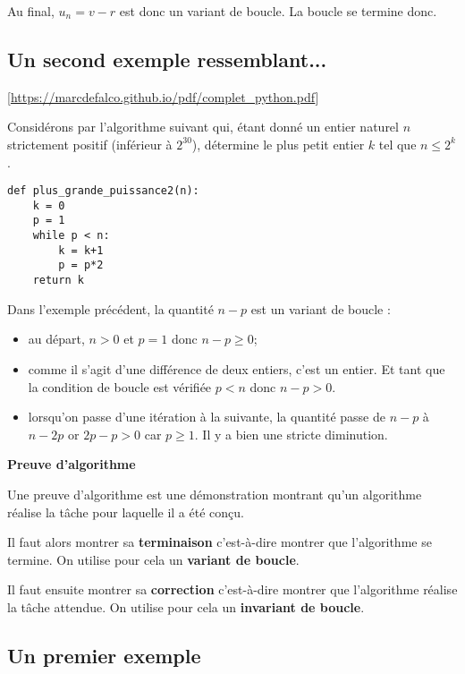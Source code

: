 Au final, $u_n = v-r$ est donc un variant de boucle. La boucle se termine donc.


\subsection{Un second exemple ressemblant...} 

\footnotesize
[\url{https://marcdefalco.github.io/pdf/complet_python.pdf}]
\normalsize

Considérons par l’algorithme suivant qui, étant donné un entier naturel $n$ strictement positif (inférieur à $2^{30}$), détermine le plus petit entier $k$ tel que $n \leq 2^k$.
\begin{lstlisting}
def plus_grande_puissance2(n):
    k = 0
    p = 1
    while p < n:
        k = k+1
        p = p*2
    return k
\end{lstlisting}
Dans l’exemple précédent, la quantité $n - p$ est un variant de boucle :
\begin{itemize}
\item au départ, $n > 0$ et $p = 1$ donc $n - p \geq 0$;
\item comme il s’agit d’une différence de deux entiers, c’est un entier. Et tant que la condition
de boucle est vérifiée $p < n$ donc $n - p > 0$.
\item lorsqu’on passe d’une itération à la suivante, la quantité passe de $n-p$ à $n-2p$ or $2p-p > 0$
car $p \geq 1$. Il y a bien une stricte diminution.
\end{itemize}

\newpage


\begin{defi} 
\textbf{Preuve d'algorithme}

Une preuve d'algorithme est une démonstration montrant qu'un algorithme réalise la tâche pour laquelle il a été conçu. 

Il faut alors montrer sa \textbf{terminaison} c'est-à-dire montrer que l'algorithme se termine. On utilise pour cela un \textbf{variant de boucle}.

Il faut ensuite montrer sa \textbf{correction} c'est-à-dire montrer que l'algorithme réalise la tâche attendue. On utilise pour cela un \textbf{invariant de boucle}.
\end{defi}



\subsection{Un premier exemple}

